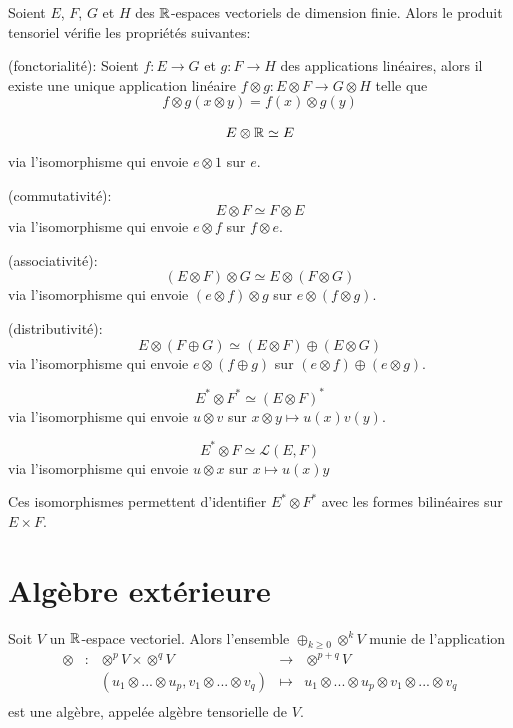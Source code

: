 \documentclass[12pt, a4paper]{book}
\begin{document}
\begin{pro}
Soient $E$, $F$, $G$ et $H$ des $\mathbb{R}$-espaces vectoriels de dimension finie. Alors le produit tensoriel vérifie les propriétés suivantes:
\be
	\item (fonctorialité): Soient $f: E\to G$ et $g: F\to H$ des applications linéaires, alors il existe une unique application linéaire $f\otimes g: E\otimes F \to G \otimes H$ telle que 
	$$f\otimes g(x\otimes y) = f(x) \otimes g(y)$$
	\item $$E \otimes \mathbb{R} \simeq E$$
	via l'isomorphisme qui envoie $e\otimes 1$ sur $e$.
	\item (commutativité): $$E\otimes F \simeq F \otimes E$$
	via l'isomorphisme qui envoie $e\otimes f$ sur $f\otimes e$.
	\item (associativité): $$(E\otimes F)\otimes G \simeq E \otimes (F\otimes G)$$
	via l'isomorphisme qui envoie $(e\otimes f)\otimes g$ sur $e\otimes (f\otimes g)$.
	\item (distributivité): $$E \otimes (F \oplus G) \simeq (E \otimes F) \oplus (E \otimes G)$$
	via l'isomorphisme qui envoie $e\otimes (f\oplus g)$ sur $(e\otimes f) \oplus (e \otimes g)$.
	\item $$E^* \otimes F^* \simeq (E\otimes F)^*$$
	via l'isomorphisme qui envoie $u\otimes v$ sur $x\otimes y \mapsto u(x)v(y)$.
	\item $$E^*\otimes F \simeq \mathscr{L}(E, F)$$
	via l'isomorphisme qui envoie $u\otimes x$ sur $x \mapsto u(x)y$
\ee
\end{pro}

\begin{rem}
Ces isomorphismes permettent d'identifier $E^*\otimes F^*$ avec les formes bilinéaires sur $E \times F$.
\end{rem}

\section{Algèbre extérieure}

\begin{defi}
Soit $V$ un $\mathbb{R}$-espace vectoriel. Alors l'ensemble $\oplus_{k\geq 0} \otimes^k V$ munie de l'application 
$$\begin{array}{ccccc}
	\otimes & : & \otimes^p V\times \otimes^q V & \to & \otimes^{p+q} V \\
		& & (u_1\otimes ...\otimes u_p, v_1 \otimes ... \otimes v_q) & \mapsto & u_1 \otimes ... \otimes u_p \otimes v_1 \otimes ... \otimes v_q \\
\end{array}$$
est une algèbre, appelée algèbre tensorielle de $V$.
\end{defi}
\end{document}

